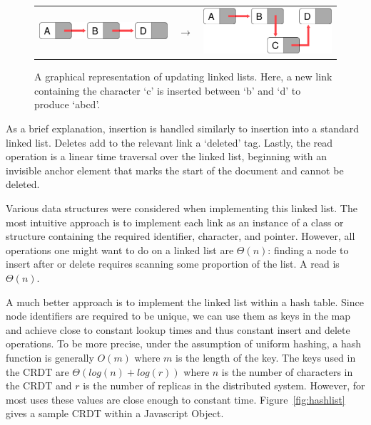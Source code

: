 \documentclass[12pt,a4paper,twoside,openright]{report}
\begin{document}
		
		\begin{figure}[htb]
		\centering
		  \begin{tabular}{ >{\centering}m{6cm} >{\centering}m{15mm} >{\centering\arraybackslash}m{6cm} }
		    \includegraphics[width=1\linewidth]{figs/linkedlist_0.eps}  &
		    $\longrightarrow$  &
		    \includegraphics[width=1\linewidth]{figs/linkedlist.eps}
		  \end{tabular}
		\caption[Updating linked lists]{A graphical representation of updating linked lists. Here, a new link containing the character `c' is inserted between `b' and `d' to produce `abcd'.}
		\label{fig:linkedlist}
		\end{figure}
		
		As a brief explanation, insertion is handled similarly to insertion into a standard linked list. Deletes add to the relevant link a `deleted' tag. Lastly, the read operation is a linear time traversal over the linked list, beginning with an invisible anchor element that marks the start of the document and cannot be deleted.
		
		Various data structures were considered when implementing this linked list. The most intuitive approach is to implement each link as an instance of a class or structure containing the required identifier, character, and pointer. However, all operations one might want to do on a linked list are $\Theta (n)$: finding a node to insert after or delete requires scanning some proportion of the list. A read is $\Theta (n)$. 
		
		A much better approach is to implement the linked list within a hash table. Since node identifiers are required to be unique, we can use them as keys in the map and achieve close to constant lookup times and thus constant insert and delete operations. To be more precise, under the assumption of uniform hashing, a hash function is generally $O(m)$ where $m$ is the length of the key. The keys used in the CRDT are $\Theta (log(n)+log(r))$ where $n$ is the number of characters in the CRDT and $r$ is the number of replicas in the distributed system. However, for most uses these values are close enough to constant time. Figure~\ref{fig:hashlist} gives a sample CRDT within a Javascript Object.
		
\end{document}
